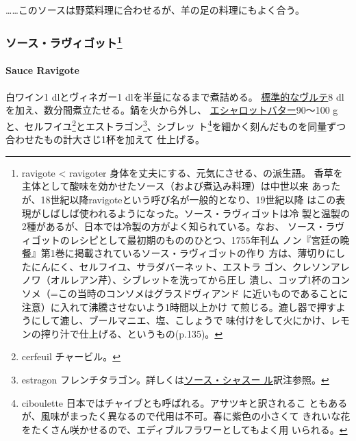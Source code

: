 \begin{recette}
\ldots{}\ldots{}このソースは野菜料理に合わせるが、羊の足の料理にもよく合う。

\maeaki

\hypertarget{ux30bdux30fcux30b9ux30e9ux30f4ux30a3ux30b4ux30c3ux30c8114}{%
\subsubsection[ソース・ラヴィゴット]{\texorpdfstring{ソース・ラヴィゴット\footnote{ravigote
  \textless{} ravigoter 身体を丈夫にする、元気にさせる、の派生語。
  香草を主体として酸味を効かせたソース（および煮込み料理）は中世以来
  あったが、18世紀以降ravigoteという呼び名が一般的となり、19世紀以降
  はこの表現がしばしば使われるようになった。ソース・ラヴィゴットは冷
  製と温製の2種があるが、日本では冷製の方がよく知られている。なお、
  ソース・ラヴィゴットのレシピとして最初期のもののひとつ、1755年刊ム
  ノン『宮廷の晩餐』第1巻に掲載されているソース・ラヴィゴットの作り
  方は、薄切りにしたにんにく、セルフイユ、サラダバーネット、エストラ
  ゴン、クレソンアレノワ（オルレアン芹）、シブレットを洗ってから圧し
  潰し、コップ1杯のコンソメ（=この当時のコンソメはグラスドヴィアンド
  に近いものであることに注意）に入れて沸騰させないよう1時間以上かけ
  て煎じる。漉し器で押すようにして漉し、ブールマニエ、塩、こしょうで
  味付けをして火にかけ、レモンの搾り汁で仕上げる、というもの(p.135)。}}{ソース・ラヴィゴット}}\label{ux30bdux30fcux30b9ux30e9ux30f4ux30a3ux30b4ux30c3ux30c8114}}

\hypertarget{sauce-ravigote}{%
\paragraph{Sauce Ravigote}\label{sauce-ravigote}}


白ワイン1\undemi{} dlとヴィネガー1\undemi{} dlを半量になるまで煮詰める。
\protect\hyperlink{veloute}{標準的なヴルテ}8
dlを加え、数分間煮立たせる。鍋を火から外し、
\protect\hyperlink{}{エシャロットバター}90〜100
gと、セルフイユ\footnote{cerfeuil チャービル。}とエストラゴン\footnote{estragon
  フレンチタラゴン。詳しくは\protect\hyperlink{sauce-chasseur}{ソース・シャスー
  ル}訳注参照。}、シブレッ ト\footnote{ciboulette
  日本ではチャイブとも呼ばれる。アサツキと訳されるこ
  ともあるが、風味がまったく異なるので代用は不可。春に紫色の小さくて
  きれいな花をたくさん咲かせるので、エディブルフラワーとしてもよく用
  いられる。}を細かく刻んだものを同量ずつ合わせたもの計大さじ1\undemi{}杯を加えて
仕上げる。


\end{recette}
